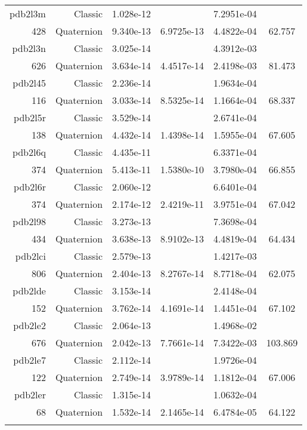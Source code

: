 \begin{xltabular}{\textwidth}{r|rS[table-format=1.3e+2]S[table-format=1.4e+2]S[table-format=1.4e+2]S[table-format=-1.3]}
pdb2l3m & Classic & 1.028e-12 &  & 7.2951e-04 & \\
428 & Quaternion & 9.340e-13 & 6.9725e-13 & 4.4822e-04 & 62.757\\  \addlinespace
pdb2l3n & Classic & 3.025e-14 &  & 4.3912e-03 & \\
626 & Quaternion & 3.634e-14 & 4.4517e-14 & 2.4198e-03 & 81.473\\  \addlinespace
pdb2l45 & Classic & 2.236e-14 &  & 1.9634e-04 & \\
116 & Quaternion & 3.033e-14 & 8.5325e-14 & 1.1664e-04 & 68.337\\  \addlinespace
pdb2l5r & Classic & 3.529e-14 &  & 2.6741e-04 & \\
138 & Quaternion & 4.432e-14 & 1.4398e-14 & 1.5955e-04 & 67.605\\  \addlinespace
pdb2l6q & Classic & 4.435e-11 &  & 6.3371e-04 & \\
374 & Quaternion & 5.413e-11 & 1.5380e-10 & 3.7980e-04 & 66.855\\  \addlinespace
pdb2l6r & Classic & 2.060e-12 &  & 6.6401e-04 & \\
374 & Quaternion & 2.174e-12 & 2.4219e-11 & 3.9751e-04 & 67.042\\  \addlinespace
pdb2l98 & Classic & 3.273e-13 &  & 7.3698e-04 & \\
434 & Quaternion & 3.638e-13 & 8.9102e-13 & 4.4819e-04 & 64.434\\  \addlinespace
pdb2lci & Classic & 2.579e-13 &  & 1.4217e-03 & \\
806 & Quaternion & 2.404e-13 & 8.2767e-14 & 8.7718e-04 & 62.075\\  \addlinespace
pdb2lde & Classic & 3.153e-14 &  & 2.4148e-04 & \\
152 & Quaternion & 3.762e-14 & 4.1691e-14 & 1.4451e-04 & 67.102\\  \addlinespace
pdb2le2 & Classic & 2.064e-13 &  & 1.4968e-02 & \\
676 & Quaternion & 2.042e-13 & 7.7661e-14 & 7.3422e-03 & 103.869\\  \addlinespace
pdb2le7 & Classic & 2.112e-14 &  & 1.9726e-04 & \\
122 & Quaternion & 2.749e-14 & 3.9789e-14 & 1.1812e-04 & 67.006\\  \addlinespace
pdb2ler & Classic & 1.315e-14 &  & 1.0632e-04 & \\
68 & Quaternion & 1.532e-14 & 2.1465e-14 & 6.4784e-05 & 64.122\\  \addlinespace

\end{xltabular}
